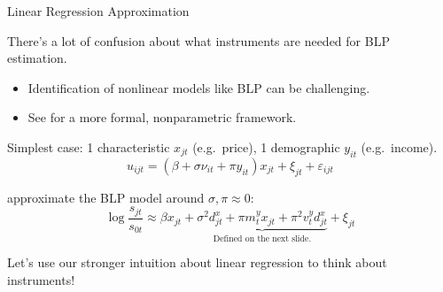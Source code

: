 \documentclass[aspectratio=169,t,11pt,table]{beamer}
\begin{document}
\begin{frame}{Linear Regression Approximation}
    \begin{wideitemize}
        \item There's a lot of confusion about what instruments are needed for BLP estimation.
        \begin{itemize}
            \item Identification of nonlinear models like BLP can be challenging.
            \item See \cite{berry2014identification,berry2023nonparametric} for a more formal, nonparametric framework.
        \end{itemize}
        \pause
        \item Simplest case: 1 characteristic $x_{jt}$ (e.g.\ price), 1 demographic $y_{it}$ (e.g.\ income).
        \begin{equation*}
            u_{ijt} = (\beta + \sigma \nu_{it} + \pi y_{it}) x_{jt} + \xi_{jt} + \varepsilon_{ijt} 
        \end{equation*}
        \vspace{-1.5\baselineskip}
        \pause
        \item \cite{salanie2022fast} approximate the BLP model around $\sigma, \pi \approx 0$:
        \begin{equation*}
            \log\frac{s_{jt}}{s_{0t}} \approx \beta x_{jt} + \underbrace{\sigma^2 d_{jt}^x + \pi m_t^y x_{jt} + \pi^2 v_t^y d_{jt}^x}_{\text{Defined on the next slide.}} + \xi_{jt}
        \end{equation*}
        \vspace{-1.5\baselineskip}
        \pause
        \item Let's use our stronger intuition about linear regression to think about instruments!
    \end{wideitemize}
\end{frame}
\end{document}
